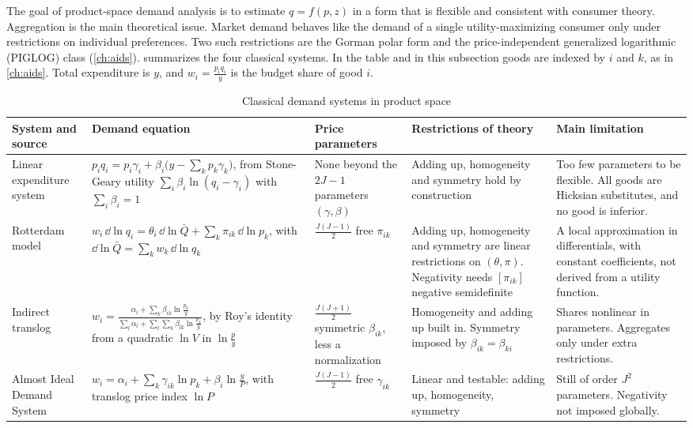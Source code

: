 The goal of product-space demand analysis is to estimate $q = f(p, z)$ in a form that is flexible and consistent
with consumer theory. Aggregation is the main theoretical issue. Market demand behaves like the demand of a single
utility-maximizing consumer only under restrictions on individual preferences. Two such restrictions are the Gorman
polar form and the price-independent generalized logarithmic (PIGLOG) class (\cref{ch:aids}).
 summarizes the four classical systems. In the table and in this subsection goods are indexed by $i$ and $k$, as in \cref{ch:aids}. Total expenditure is $y$, and
$w_i = \frac{p_i q_i}{y}$ is the budget share of good $i$.

\begin{table}[htbp]
\centering
\caption{Classical demand systems in product space}
\label{tab:04-productspace-systems}
\footnotesize
\renewcommand{\arraystretch}{1.35}
\begin{tabularx}{\textwidth}{@{}>{\raggedright\arraybackslash}p{2.15cm}>{\raggedright\arraybackslash}p{4.35cm}%
>{\raggedright\arraybackslash}p{1.9cm}>{\raggedright\arraybackslash}p{2.7cm}>{\raggedright\arraybackslash}X@{}}
\toprule
System and source & Demand equation & Price parameters & Restrictions of theory & Main limitation \\
\midrule
Linear expenditure system \citep{Stone1954}
 & $p_iq_i = p_i\gamma_i + \beta_i\big(y - \sum_k p_k\gamma_k\big)$, from Stone-Geary utility $\sum_i\beta_i\ln(q_i -
   \gamma_i)$ with $\sum_i\beta_i = 1$
 & None beyond the $2J - 1$ parameters $(\gamma, \beta)$
 & Adding up, homogeneity and symmetry hold by construction
 & Too few parameters to be flexible. All goods are Hicksian substitutes, and no good is inferior. \\
Rotterdam model \citep{Theil1965,Barten1966}
 & $w_i\,\dd\ln q_i = \theta_i\,\dd\ln\bar Q + \sum_k\pi_{ik}\,\dd\ln p_k$, with $\dd\ln\bar Q = \sum_k w_k\,\dd\ln
   q_k$
 & $\frac{J(J-1)}{2}$ free $\pi_{ik}$
 & Adding up, homogeneity and symmetry are linear restrictions on $(\theta, \pi)$. Negativity needs $[\pi_{ik}]$
   negative semidefinite
 & A local approximation in differentials, with constant coefficients, not derived from a utility function. \\
Indirect translog \citep{ChristensenJorgensonLau1975}
 & $w_i = \frac{\alpha_i + \sum_k\beta_{ik}\ln\frac{p_k}{y}}{\sum_l\alpha_l + \sum_l\sum_k\beta_{lk}\ln\frac{p_k}{y}}$,
   by Roy's identity from a quadratic $\ln V$ in $\ln\frac{p}{y}$
 & $\frac{J(J+1)}{2}$ symmetric $\beta_{ik}$, less a normalization
 & Homogeneity and adding up built in. Symmetry imposed by $\beta_{ik} = \beta_{ki}$
 & Shares nonlinear in parameters. Aggregates only under extra restrictions. \\
Almost Ideal Demand System \citep{DeatonMuellbauer1980a}
 & $w_i = \alpha_i + \sum_k\gamma_{ik}\ln p_k + \beta_i\ln\frac{y}{P}$, with translog price index $\ln P$
 & $\frac{J(J-1)}{2}$ free $\gamma_{ik}$
 & Linear and testable: adding up, homogeneity, symmetry
 & Still of order $J^2$ parameters. Negativity not imposed globally. \\
\bottomrule
\end{tabularx}


\end{table}
